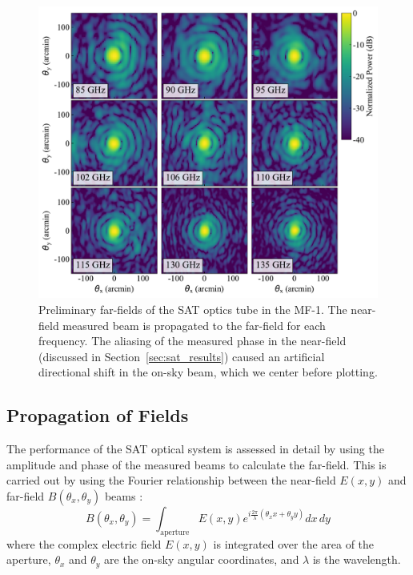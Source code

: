  \begin{figure}[t!]
    \centering
    \includegraphics[width = \textwidth]{Figures/farfield_sat.pdf}
    \caption{Preliminary far-fields of the SAT optics tube in the MF-1.  The near-field measured beam is propagated to the far-field for each frequency.  The aliasing of the measured phase in the near-field (discussed in Section~\ref{sec:sat_results}) caused an artificial directional shift in the on-sky beam, which we center before plotting.}
    \label{fig:farfields_sat}
\end{figure}

\subsection{Propagation of Fields}
\label{sec:sat_prop_fields}

The performance of the SAT optical system is assessed in detail by using the amplitude and phase of the measured beams to calculate the far-field.  This is carried out by using the Fourier relationship between the near-field $E(x,y)$ and far-field $B(\theta_x,\theta_y)$ beams \cite{McIntosh2016,alma_holog}:
\begin{equation}
    B(\theta_x,\theta_y) = \int_{\text{aperture}} E(x,y) e^{ i \frac{2\pi}{\lambda} (\theta_x x + \theta_y y )} dx \, dy 
\end{equation}
where the complex electric field $E(x,y)$ is integrated over the area of the aperture, $\theta_x$ and $\theta_y$ are the on-sky angular coordinates, and $\lambda$ is the wavelength.  

